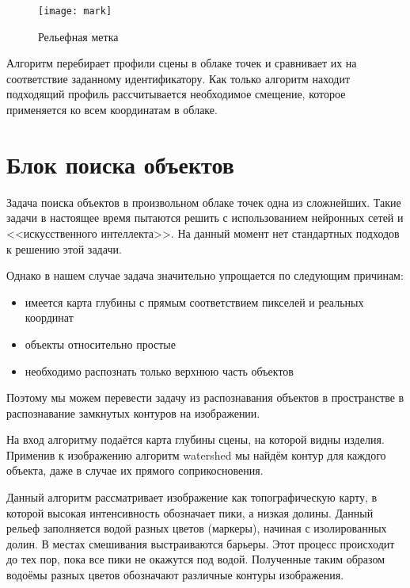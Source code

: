             \begin{figure}[H]
                \centering
                \texttt{[image: mark]}
                \caption{Рельефная метка}
                \label{pic:mark}
            \end{figure}
            
            Алгоритм перебирает профили сцены в облаке точек и сравнивает их на соответствие заданному идентификатору. Как только алгоритм находит подходящий профиль рассчитывается необходимое смещение, которое применяется ко всем координатам в облаке.
            
    \section{Блок поиска объектов}
        Задача поиска объектов в произвольном облаке точек одна из сложнейших. Такие задачи в настоящее время пытаются решить с использованием нейронных сетей и <<искусственного интеллекта>>. На данный момент нет стандартных подходов к решению этой задачи.
        
        Однако в нашем случае задача значительно упрощается по следующим причинам:
        \begin{itemize}
            \item имеется карта глубины с прямым соответствием пикселей и реальных координат
            \item объекты относительно простые
            \item необходимо распознать только верхнюю часть объектов
        \end{itemize}
        Поэтому мы можем перевести задачу из распознавания объектов в пространстве в распознавание замкнутых контуров на изображении.
        
        На вход алгоритму подаётся карта глубины сцены, на которой видны изделия. Применив к изображению алгоритм watershed мы найдём контур для каждого объекта, даже в случае их прямого соприкосновения. 
        
        Данный алгоритм рассматривает изображение как топографическую карту, в которой высокая интенсивность обозначает пики, а низкая долины. Данный рельеф заполняется водой разных цветов (маркеры), начиная с изолированных долин. В местах смешивания выстраиваются барьеры. Этот процесс происходит до тех пор, пока все пики не окажутся под водой. Полученные таким образом водоёмы разных цветов обозначают различные контуры изображения\cite{opencvWATERSHED}.
        
